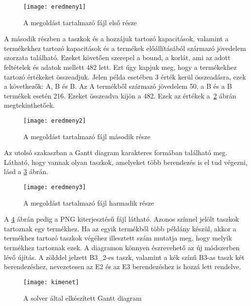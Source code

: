 \begin{figure}[H]
\begin{center}
\texttt{[image: eredmeny1]}
\caption{A megoldást tartalmazó fájl első része}
\label{eredmeny1}
\end{center}
\end{figure}

A második részben a taszkok és a hozzájuk tartozó kapacitások, valamint a termékekhez tartozó kapacitások és a termékek előállításából származó jövedelem szorzata található.
Ezeket követően szerepel a bound, a korlát, ami az adott feltételek és adatok mellett 482 lett.
Ezt úgy kapjuk meg, hogy a termékekhez tartozó értékeket összeadjuk.
Jelen példa esetében 3 érték kerül összeadásra, ezek a következők: A, B és B.
Az A termékből származó jövedelem 50, a B és a B termékek esetén 216.
Ezeket összeadva kijön a 482. Ezek az értékek a~\ref{eredmeny2} ábrán megtekinthetőek.

\begin{figure}[H]
\begin{center}
\texttt{[image: eredmeny2]}
\caption{A megoldást tartalmazó fájl második része}
\label{eredmeny2}
\end{center}
\end{figure}

Az utolsó szakaszban a Gantt diagram karakteres formában található meg.
Látható, hogy vannak olyan taszkok, amelyeket több berendezés is el tud végezni,
lásd a \ref{eredmeny3} ábrán.

\begin{figure}[H]
\begin{center}
\texttt{[image: eredmeny3]}
\caption{A megoldást tartalmazó fájl harmadik része}
\label{eredmeny3}
\end{center}
\end{figure}

A \ref{kimenet} ábrán pedig a PNG kiterjesztésű fájl látható.
Azonos színnel jelölt taszkok tartoznak egy termékhez.
Ha az egyik termékből több példány készül, akkor a termékhez tartozó taszkok végéhez illesztett szám mutatja meg, hogy melyik termékhez tartoznak ezek.
A diagramon könnyen észrevehető az új módszerben lévő újítás.
A zölddel jelzett B3\_2-es taszk, valamint a kék színű B3-as taszk két berendezéshez, nevezetesen az E2 és az E3 berendezéshez is hozzá lett rendelve. 

\begin{figure}[H]
\begin{center}
\texttt{[image: kimenet]}
\caption{A solver által elkészített Gantt diagram}
\label{kimenet}
\end{center}
\end{figure}

